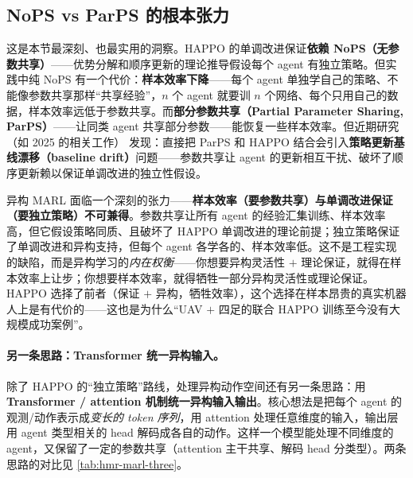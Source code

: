 \subsection{NoPS vs ParPS 的根本张力}
\label{sec:hmr-marl-tension}
这是本节最深刻、也最实用的洞察。HAPPO 的单调改进保证\textbf{依赖 NoPS（无参数共享）}——优势分解和顺序更新的理论推导假设每个 agent 有独立策略。但实践中纯 NoPS 有一个代价：\textbf{样本效率下降}——每个 agent 单独学自己的策略、不能像参数共享那样“共享经验”，$n$ 个 agent 就要训 $n$ 个网络、每个只用自己的数据，样本效率远低于参数共享。而\textbf{部分参数共享（Partial Parameter Sharing, ParPS）}——让同类 agent 共享部分参数——能恢复一些样本效率。但近期研究（如 2025 的相关工作）\cite{hmarl2025ompg} 发现：直接把 ParPS 和 HAPPO 结合会引入\textbf{策略更新基线漂移（baseline drift）}问题——参数共享让 agent 的更新相互干扰、破坏了顺序更新赖以保证单调改进的独立性假设。

\begin{insight}[样本效率与单调改进保证不可兼得]
异构 MARL 面临一个深刻的张力——\textbf{样本效率（要参数共享）与单调改进保证（要独立策略）不可兼得}。参数共享让所有 agent 的经验汇集训练、样本效率高，但它假设策略同质、且破坏了 HAPPO 单调改进的理论前提；独立策略保证了单调改进和异构支持，但每个 agent 各学各的、样本效率低。这不是工程实现的缺陷，而是异构学习的\emph{内在权衡}——你想要异构灵活性 $+$ 理论保证，就得在样本效率上让步；你想要样本效率，就得牺牲一部分异构灵活性或理论保证。HAPPO 选择了前者（保证 $+$ 异构，牺牲效率），这个选择在样本昂贵的真实机器人上是有代价的——这也是为什么“UAV $+$ 四足的联合 HAPPO 训练至今没有大规模成功案例”。
\end{insight}

\paragraph{另一条思路：Transformer 统一异构输入。}
除了 HAPPO 的“独立策略”路线，处理异构动作空间还有另一条思路：用 \textbf{Transformer / attention 机制统一异构输入输出}。核心想法是把每个 agent 的观测/动作表示成\emph{变长的 token 序列}，用 attention 处理任意维度的输入，输出层用 agent 类型相关的 head 解码成各自的动作。这样一个模型能处理不同维度的 agent，又保留了一定的参数共享（attention 主干共享、解码 head 分类型）。两条思路的对比见 \cref{tab:hmr-marl-three}。

